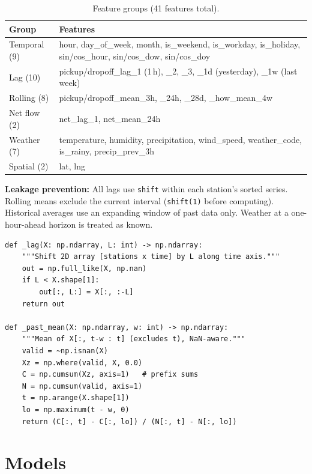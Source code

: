 \documentclass[12pt,a4paper]{report}
\begin{document}
\begin{table}[H]
\centering
\caption{Feature groups (41 features total).}
\label{tab:features}
\small
\begin{tabular}{@{}p{1.4in}p{3.5in}@{}}
\toprule
\textbf{Group} & \textbf{Features} \\
\midrule
Temporal (9) & hour, day\_of\_week, month, is\_weekend, is\_workday, is\_holiday, sin/cos\_hour, sin/cos\_dow, sin/cos\_doy \\
Lag (10) & pickup/dropoff\_lag\_1 (1\,h), \_2, \_3, \_1d (yesterday), \_1w (last week) \\
Rolling (8) & pickup/dropoff\_mean\_3h, \_24h, \_28d, \_how\_mean\_4w \\
Net flow (2) & net\_lag\_1, net\_mean\_24h \\
Weather (7) & temperature, humidity, precipitation, wind\_speed, weather\_code, is\_rainy, precip\_prev\_3h \\
Spatial (2) & lat, lng \\
\bottomrule
\end{tabular}
\end{table}

\textbf{Leakage prevention:} All lags use \texttt{shift} within each
station's sorted series. Rolling means exclude the current interval
(\texttt{shift(1)} before computing). Historical averages use an
expanding window of past data only. Weather at a one-hour-ahead
horizon is treated as known.

\begin{lstlisting}[caption={Lag and rolling-mean computation
(\texttt{features.py})},label={lst:lag}]
def _lag(X: np.ndarray, L: int) -> np.ndarray:
    """Shift 2D array [stations x time] by L along time axis."""
    out = np.full_like(X, np.nan)
    if L < X.shape[1]:
        out[:, L:] = X[:, :-L]
    return out

def _past_mean(X: np.ndarray, w: int) -> np.ndarray:
    """Mean of X[:, t-w : t] (excludes t), NaN-aware."""
    valid = ~np.isnan(X)
    Xz = np.where(valid, X, 0.0)
    C = np.cumsum(Xz, axis=1)   # prefix sums
    N = np.cumsum(valid, axis=1)
    t = np.arange(X.shape[1])
    lo = np.maximum(t - w, 0)
    return (C[:, t] - C[:, lo]) / (N[:, t] - N[:, lo])
\end{lstlisting}

\section{Models}
\end{document}
